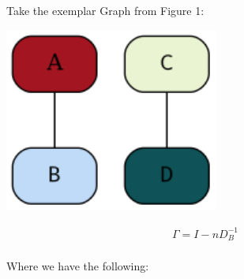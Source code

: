 \documentclass[11pt]{article}
\begin{document}
Take the exemplar Graph from Figure 1:


\begin{center}
\includegraphics[width=7cm]{./Media/Example.png}
\end{center}



\begin{align}
    \Gamma =  I - n D^{- 1}_B \\
\end{align}

Where we have the following:
\end{document}
